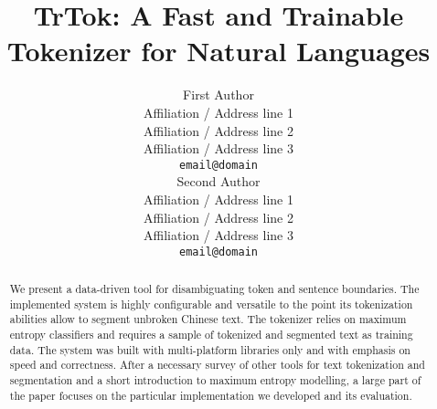 \documentclass[11pt]{article}
\title{TrTok: A Fast and Trainable Tokenizer for Natural Languages}
\author{First Author \\
  Affiliation / Address line 1 \\
  Affiliation / Address line 2 \\
  Affiliation / Address line 3 \\
  {\tt email@domain} \\\And
  Second Author \\
  Affiliation / Address line 1 \\
  Affiliation / Address line 2 \\
  Affiliation / Address line 3 \\
  {\tt email@domain} \\}
\date{}
\begin{document}
\maketitle
\begin{abstract}
We present a data-driven tool for disambiguating token and sentence
boundaries. The implemented system is highly configurable and
versatile to the point its tokenization abilities allow to segment
unbroken Chinese text. The tokenizer relies on maximum entropy
classifiers and requires a sample of tokenized and segmented text as
training data. The system was built with multi-platform libraries only
and with emphasis on speed and correctness. After a necessary survey
of other tools for text tokenization and segmentation and a short
introduction to maximum entropy modelling, a large part of the paper
focuses on the particular implementation we developed and its
evaluation.
\end{abstract}









\end{document}
